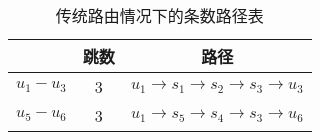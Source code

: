 
\begin{table}[h]
  \centering
  \begin{tabular}{ccc}
    \toprule
    & 跳数 & 路径 \\
    \midrule
    $ u_1 - u_3 $ & 3 & $ u_1 \rightarrow s_1 \rightarrow s_2 \rightarrow s_3 \rightarrow u_3 $ \\
    $ u_5 - u_6 $ & 3 & $ u_1 \rightarrow s_5 \rightarrow s_4 \rightarrow s_3 \rightarrow u_6 $ \\
    \bottomrule
  \end{tabular}
  \caption{传统路由情况下的条数路径表}
\end{table}